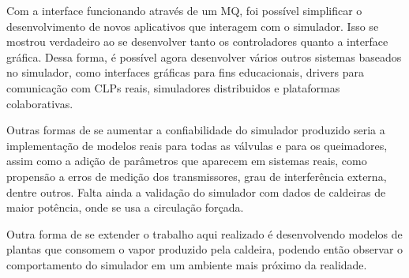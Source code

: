 Com a interface funcionando através de um MQ, foi possível simplificar
o desenvolvimento de novos aplicativos que interagem com o
simulador. Isso se mostrou verdadeiro ao se desenvolver tanto os
controladores quanto a interface gráfica. Dessa forma, é possível
agora desenvolver vários outros sistemas baseados no simulador, como
interfaces gráficas para fins educacionais, drivers para comunicação
com CLPs reais, simuladores distribuidos e plataformas colaborativas.

Outras formas de se aumentar a confiabilidade do simulador produzido
seria a implementação de modelos reais para todas as válvulas e para
os queimadores, assim como a adição de parâmetros que aparecem em
sistemas reais, como propensão a erros de medição dos transmissores,
grau de interferência externa, dentre outros. Falta ainda a validação
do simulador com dados de caldeiras de maior potência, onde se usa a
circulação forçada.

Outra forma de se extender o trabalho aqui realizado é desenvolvendo
modelos de plantas que consomem o vapor produzido pela caldeira,
podendo então observar o comportamento do simulador em um ambiente
mais próximo da realidade.
